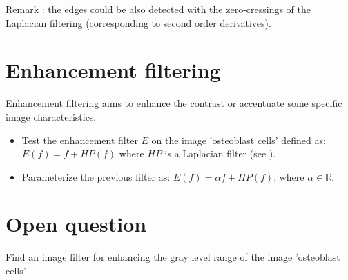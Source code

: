 Remark : the edges could be also detected with the zero-cressings of the Laplacian filtering  (corresponding to second order derivatives).

 

\section{Enhancement filtering}
Enhancement filtering aims to enhance the contrast or accentuate some specific image characteristics.
\begin{qbox}
\begin{itemize}
	\item Test the enhancement filter $E$ on the image 'osteoblast cells' defined as:
	$E(f)=f+HP(f)$ where $HP$ is a Laplacian filter (see  ).
	\item Parameterize the previous filter as:
	$E(f)=\alpha f+HP(f)$, where $\alpha\in\mathbb{R}$.
\end{itemize}
\end{qbox}

\section{Open question}
Find an image filter for enhancing the gray level range of the image 'osteoblast cells'.


